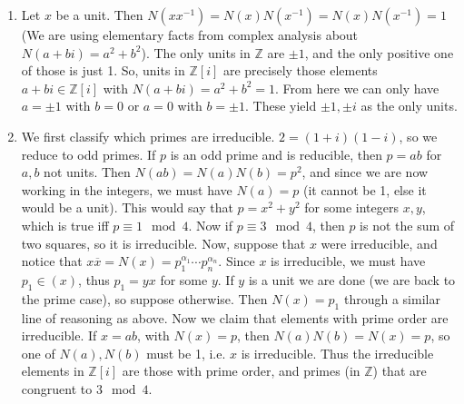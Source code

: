 \documentclass[12pt]{article}
\theoremstyle{definitionstyle}
\def\mbb#1{\mathbb{#1}}
\newcommand{\Z}{\mbb Z}
\begin{document}
\begin{enumerate}[leftmargin=\labelsep]
\begin{enumerate}
			\item Let $x$ be a unit. Then $N(x x^{-1}) = N(x)N(x^{-1}) = N(x)N(x^{-1}) = 1$ (We are using elementary facts from complex analysis about $N(a+bi)=a^2+b^2$). The only units in $\Z$ are $\pm1$, and the only positive one of those is just 1. So, units in $\Z[i]$ are precisely those elements $a+bi \in \Z[i]$ with $N(a+bi) = a^2+b^2=1$. From here we can only have $a = \pm 1$ with $b =0$ or $a = 0$ with $b = \pm 1$. These yield $\pm 1, \pm i$ as the only units.
			
			\item We first classify which primes are irreducible. $2 = (1+i)(1-i)$, so we reduce to odd primes. If $p$ is an odd prime and is reducible, then $p = ab$ for $a,b$ not units. Then $N(ab) = N(a)N(b) = p^2$, and since we are now working in the integers, we must have $N(a) = p$ (it cannot be 1, else it would be a unit). This would say that $p = x^2+y^2$ for some integers $x,y$, which is true iff $p \equiv 1 \mod 4$. Now if $p \equiv 3 \mod 4$, then $p$ is not the sum of two squares, so it is irreducible. Now, suppose that $x$ were irreducible, and notice that $x \overline x = N(x) = p_1^{\alpha_1} \cdots p_n^{\alpha_n}$. Since $x$ is irreducible, we must have $p_1 \in (x)$, thus $p_1 = yx$ for some $y$. If $y$ is a unit we are done (we are back to the prime case), so suppose otherwise. Then $N(x) = p_1$ through a similar line of reasoning as above. Now we claim that elements with prime order are irreducible. If $x = ab$, with $N(x) = p$, then $N(a)N(b) = N(x) = p$, so one of $N(a), N(b)$ must be 1, i.e. $x$ is irreducible. Thus the irreducible elements in $\Z[i]$ are those with prime order, and primes (in $\Z$) that are congruent to $3 \mod 4$.
		\end{enumerate}
	

\end{enumerate}
\end{document}

